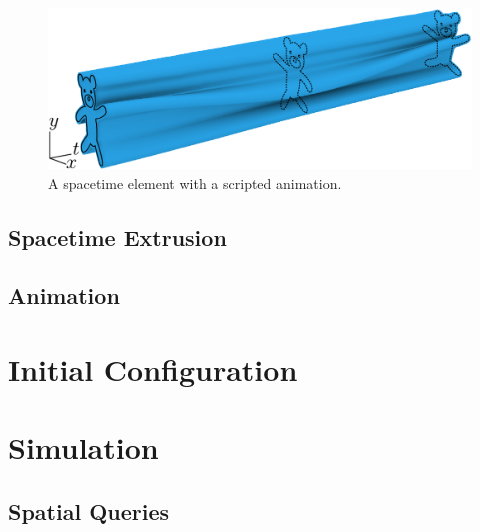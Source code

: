 \begin{figure}
\centering
\includegraphics[width=1.0\columnwidth]{figures/animationpak/spacetime_element.pdf} 
\caption[A spacetime element with a scripted animation]
{\label{fig_spacetime_element} 
A spacetime element with a scripted animation.}
\end{figure}


\subsection{Spacetime Extrusion}


\subsection{Animation}


\section{Initial Configuration}


\section{Simulation}


\subsection{Spatial Queries}


